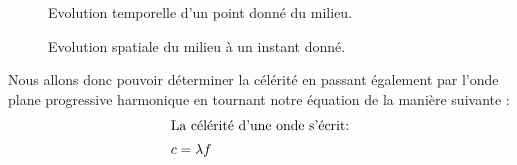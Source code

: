 \begin{figure}[h]
    \centering
    \begin{minipage}{0.45\textwidth}
        \centering
        \caption{Evolution temporelle d'un point donné du milieu.~\cite{propagation-onde}}
    \end{minipage}
    \hfill
    \begin{minipage}{0.45\textwidth}
        \centering
        \caption{Evolution spatiale du milieu à un instant donné.~\cite{propagation-onde}}
    \end{minipage}
\end{figure}

Nous allons donc pouvoir déterminer la célérité 
en passant également par l'onde plane progressive harmonique en tournant 
notre équation de la manière suivante :
\begin{align}
    \shortintertext{La célérité d'une onde s'écrit:}
    c &= \lambda f
\end{align}

